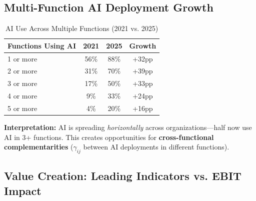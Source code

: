 \subsection{Multi-Function AI Deployment Growth}

\begin{table}[htbp]
\centering
\caption{AI Use Across Multiple Functions (2021 vs. 2025)}
\label{tab:vvv1-functions}
\renewcommand{\arraystretch}{1.3}
\begin{tabular}{@{}lccc@{}}
\toprule
\textbf{Functions Using AI} & \textbf{2021} & \textbf{2025} & \textbf{Growth} \\
\midrule
1 or more & 56\% & 88\% & +32pp \\
2 or more & 31\% & 70\% & +39pp \\
3 or more & 17\% & 50\% & +33pp \\
4 or more & 9\% & 33\% & +24pp \\
5 or more & 4\% & 20\% & +16pp \\
\bottomrule
\end{tabular}
\end{table}

\textbf{Interpretation:} AI is spreading \textit{horizontally} across organizations---half now use AI in 3+ functions. This creates opportunities for \textbf{cross-functional complementarities} ($\gamma_{ij}$ between AI deployments in different functions).


\subsection{Value Creation: Leading Indicators vs. EBIT Impact}
\label{sec:vvv1-value}

